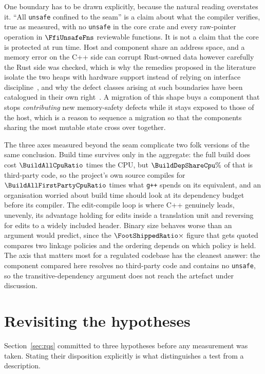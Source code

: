 One boundary has to be drawn explicitly, because the natural reading overstates it. ``All
\texttt{unsafe} confined to the seam'' is a claim about what the compiler verifies, true as
measured, with no \texttt{unsafe} in the core crate and every raw-pointer operation in
$\FfiUnsafeFns$ reviewable functions. It is not a claim that the core is protected at run time.
Host and component share an address space, and a memory error on the C++ side can corrupt
Rust-owned data however carefully the Rust side was checked, which is why the remedies proposed in
the literature isolate the two heaps with hardware support instead of relying on interface
discipline~\cite{rivera2021galeed,kirth2022pkrusafe}, and why the defect classes arising at such
boundaries have been catalogued in their own right~\cite{li2022crosslang}. A migration of this
shape buys a component that stops \emph{contributing} new memory-safety defects while it stays
exposed to those of the host, which is a reason to sequence a migration so that the components
sharing the most mutable state cross over together.

The three axes measured beyond the seam complicate two folk versions of the same conclusion. Build
time survives only in the aggregate: the full build does cost $\BuildAllCpuRatio$ times the CPU,
but $\BuildDepShareCpu\%$ of that is third-party code, so the project's own source compiles for
$\BuildAllFirstPartyCpuRatio$ times what \texttt{g++} spends on its equivalent, and an
organisation worried about build time should look at its dependency budget before its compiler.
The edit-compile loop is where C++ genuinely leads, unevenly, its advantage holding for edits
inside a translation unit and reversing for edits to a widely included header. Binary size behaves
worse than an argument would predict, since the $\FootShippedRatio\times$ figure that gets quoted
compares two linkage policies and the ordering depends on which policy is held. The axis that
matters most for a regulated codebase has the cleanest answer: the component compared here
resolves no third-party code and contains no \texttt{unsafe}, so the transitive-dependency
argument does not reach the artefact under discussion.

\section{Revisiting the hypotheses}\label{sec:hypotheses}
Section~\ref{sec:rqs} committed to three hypotheses before any measurement was taken. Stating
their disposition explicitly is what distinguishes a test from a description.

